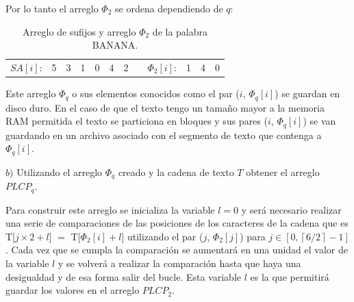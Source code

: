 \newpage

Por lo tanto el arreglo $\Phi_{2}$ se ordena dependiendo de $q$:

\begin{table}[!htb]
\centering
\begin{tabular}{c|c|c|c|c|c|c|cc|c|c|c|}
\cline{2-7} \cline{10-12}
$SA[i]$: & 5 & 3 & 1 & 0 & 4 & 2 &  & $\Phi_{2}[i]$: & 1 & 4 & 0 \\ \cline{2-7} \cline{10-12} 
\end{tabular}
\caption{Arreglo de sufijos y arreglo $\Phi_{2}$ de la palabra BANANA.}
\end{table}


Este arreglo $\Phi_{q}$ o sus elementos conocidos como el par ($i$, $\Phi_{q}[i]$) se guardan en disco duro. En el caso de que el texto tengo un tamaño mayor a la memoria RAM permitida el texto se particiona en bloques y sus pares ($i$, $\Phi_{q}[i]$) se van guardando en un archivo asociado con el segmento de texto que contenga a $\Phi_{q}[i]$.

$b)$ Utilizando el arreglo $\Phi_{q}$ creado y la cadena de texto $T$ obtener el arreglo $PLCP_{q}$.

Para construir este arreglo se inicializa la variable $l=0$ y será necesario realizar una serie de comparaciones de las posiciones de los caracteres de la cadena que es T[$j \times 2+l$] $=$ T[$\Phi_{2}[i]+l$] utilizando el par ($j$, $\Phi_{2}[j]$) para $j \in [0, \left \lceil{6/2}\right \rceil - 1]$. Cada vez que se cumpla la comparación se aumentará en una unidad el valor de la variable $l$ y se volverá a realizar la comparación hasta que haya una desigualdad y de esa forma salir del bucle. Esta variable $l$ es la que permitirá guardar los valores en el arreglo $PLCP_{2}$.

